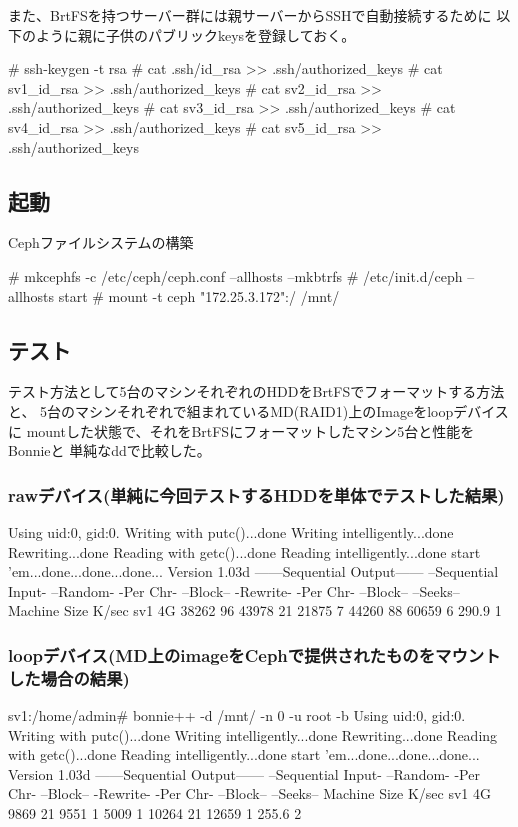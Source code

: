 \documentclass[mingoth,a4paper]{jsarticle}
\begin{document}
また、BrtFSを持つサーバー群には親サーバーからSSHで自動接続するために
以下のように親に子供のパブリックkeysを登録しておく。
\begin{commandline}
# ssh-keygen -t rsa
# cat .ssh/id_rsa >> .ssh/authorized_keys
# cat sv1_id_rsa >> .ssh/authorized_keys
# cat sv2_id_rsa >> .ssh/authorized_keys
# cat sv3_id_rsa >> .ssh/authorized_keys
# cat sv4_id_rsa >> .ssh/authorized_keys
# cat sv5_id_rsa >> .ssh/authorized_keys
\end{commandline}

\subsection{起動}
Cephファイルシステムの構築
\begin{commandline}
# mkcephfs -c /etc/ceph/ceph.conf --allhosts --mkbtrfs
# /etc/init.d/ceph --allhosts start
# mount -t ceph "172.25.3.172":/ /mnt/
\end{commandline}

\subsection{テスト}
テスト方法として5台のマシンそれぞれのHDDをBrtFSでフォーマットする方法と、
5台のマシンそれぞれで組まれているMD(RAID1)上のImageをloopデバイスに
mountした状態で、それをBrtFSにフォーマットしたマシン5台と性能をBonnieと
単純なddで比較した。

\subsubsection{rawデバイス(単純に今回テストするHDDを単体でテストした結果)}
\begin{commandline}
 Using uid:0, gid:0.
 Writing with putc()...done
 Writing intelligently...done
 Rewriting...done
 Reading with getc()...done
 Reading intelligently...done
 start 'em...done...done...done...
 Version 1.03d       ------Sequential Output------ --Sequential Input- --Random-
                     -Per Chr- --Block-- -Rewrite- -Per Chr- --Block-- --Seeks--
 Machine        Size K/sec %
 sv1            4G 38262  96 43978  21 21875   7 44260  88 60659   6 290.9   1
\end{commandline}
 
\subsubsection{loopデバイス(MD上のimageをCephで提供されたものをマウントした場合の結果)}
\begin{commandline}
 sv1:/home/admin# bonnie++ -d /mnt/ -n 0 -u root -b
 Using uid:0, gid:0.
 Writing with putc()...done
 Writing intelligently...done
 Rewriting...done
 Reading with getc()...done
 Reading intelligently...done
 start 'em...done...done...done...
 Version 1.03d       ------Sequential Output------ --Sequential Input- --Random-
                     -Per Chr- --Block-- -Rewrite- -Per Chr- --Block-- --Seeks--
 Machine        Size K/sec %
 sv1            4G  9869  21  9551   1  5009   1 10264  21 12659   1 255.6   2
\end{commandline}
\end{document}
